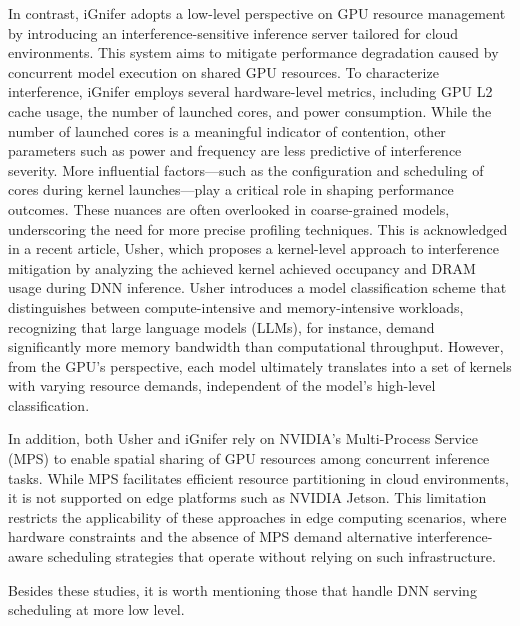 In contrast, iGnifer adopts a low-level perspective on GPU resource management by introducing an interference-sensitive inference server tailored for cloud environments. This system aims to mitigate performance degradation caused by concurrent model execution on shared GPU resources. To characterize interference, iGnifer employs several hardware-level metrics, including GPU L2 cache usage, the number of launched cores, and power consumption. While the number of launched cores is a meaningful indicator of contention, other parameters such as power and frequency are less predictive of interference severity. More influential factors—such as the configuration and scheduling of cores during kernel launches—play a critical role in shaping performance outcomes. These nuances are often overlooked in coarse-grained models, underscoring the need for more precise profiling techniques.
This is acknowledged in a recent article, Usher, which proposes a kernel-level approach to interference mitigation by analyzing the achieved kernel achieved occupancy and DRAM usage during DNN inference. Usher introduces a model classification scheme that distinguishes between compute-intensive and memory-intensive workloads, recognizing that large language models (LLMs), for instance, demand significantly more memory bandwidth than computational throughput. However, from the GPU's perspective, each model ultimately translates into a set of kernels with varying resource demands, independent of the model's high-level classification.

In addition, both Usher and iGnifer rely on NVIDIA's Multi-Process Service (MPS) to enable spatial sharing of GPU resources among concurrent inference tasks. While MPS facilitates efficient resource partitioning in cloud environments, it is not supported on edge platforms such as NVIDIA Jetson. This limitation restricts the applicability of these approaches in edge computing scenarios, where hardware constraints and the absence of MPS demand alternative interference-aware scheduling strategies that operate without relying on such infrastructure.


Besides these studies, it is worth mentioning those that handle DNN serving scheduling at more low level.  





